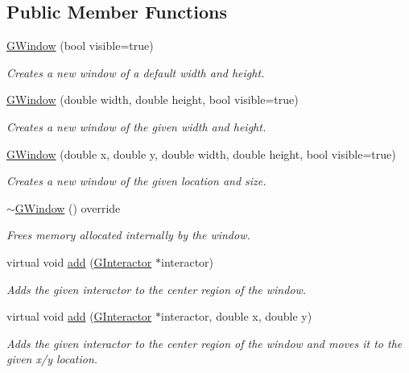 \subsection*{Public Member Functions}
\begin{DoxyCompactItemize}
\item 
\mbox{\hyperlink{classsgl_1_1GWindow_a7fdeab875fb526a49423085ac13ac9f2}{G\+Window}} (bool visible=true)
\begin{DoxyCompactList}\small\item\em Creates a new window of a default width and height. \end{DoxyCompactList}\item 
\mbox{\hyperlink{classsgl_1_1GWindow_acb88532777f61b140aa8245ed1d9887e}{G\+Window}} (double width, double height, bool visible=true)
\begin{DoxyCompactList}\small\item\em Creates a new window of the given width and height. \end{DoxyCompactList}\item 
\mbox{\hyperlink{classsgl_1_1GWindow_ac66942f456baa6c43ecd0ed60138fe36}{G\+Window}} (double x, double y, double width, double height, bool visible=true)
\begin{DoxyCompactList}\small\item\em Creates a new window of the given location and size. \end{DoxyCompactList}\item 
\mbox{\hyperlink{classsgl_1_1GWindow_ab867b220db73c03e315b48c01f868e27}{$\sim$\+G\+Window}} () override
\begin{DoxyCompactList}\small\item\em Frees memory allocated internally by the window. \end{DoxyCompactList}\item 
virtual void \mbox{\hyperlink{classsgl_1_1GWindow_a6f99b7c841256dbdc5acaafbbca4e685}{add}} (\mbox{\hyperlink{classsgl_1_1GInteractor}{G\+Interactor}} $\ast$interactor)
\begin{DoxyCompactList}\small\item\em Adds the given interactor to the center region of the window. \end{DoxyCompactList}\item 
virtual void \mbox{\hyperlink{classsgl_1_1GWindow_aca25fb0fc7d200e9c4fd23830d2d413d}{add}} (\mbox{\hyperlink{classsgl_1_1GInteractor}{G\+Interactor}} $\ast$interactor, double x, double y)
\begin{DoxyCompactList}\small\item\em Adds the given interactor to the center region of the window and moves it to the given x/y location. \end{DoxyCompactList}\item 

\end{DoxyCompactItemize}
